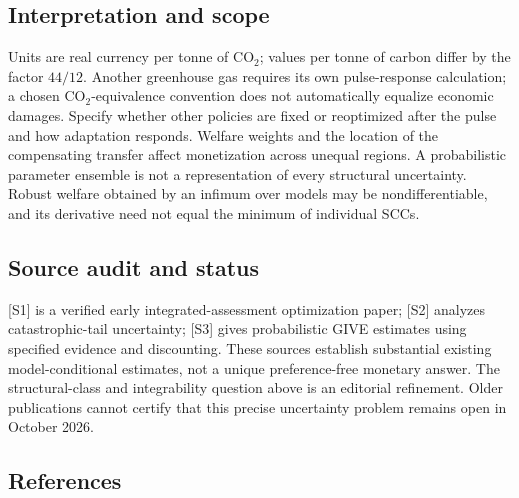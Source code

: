 \documentclass[11pt,a4paper]{article}
\begin{document}
\subsection*{Interpretation and scope}

Units are real currency per tonne of $\mathrm{CO}_2$; values per tonne of carbon differ by the factor $44/12$. Another greenhouse gas requires its own pulse-response calculation; a chosen $\mathrm{CO}_2$-equivalence convention does not automatically equalize economic damages. Specify whether other policies are fixed or reoptimized after the pulse and how adaptation responds. Welfare weights and the location of the compensating transfer affect monetization across unequal regions. A probabilistic parameter ensemble is not a representation of every structural uncertainty. Robust welfare obtained by an infimum over models may be nondifferentiable, and its derivative need not equal the minimum of individual SCCs.

\subsection*{Source audit and status}

[S1] is a verified early integrated-assessment optimization paper; [S2] analyzes catastrophic-tail uncertainty; [S3] gives probabilistic GIVE estimates using specified evidence and discounting. These sources establish substantial existing model-conditional estimates, not a unique preference-free monetary answer. The structural-class and integrability question above is an editorial refinement. Older publications cannot certify that this precise uncertainty problem remains open in October 2026.

\subsection*{References}
\end{document}
